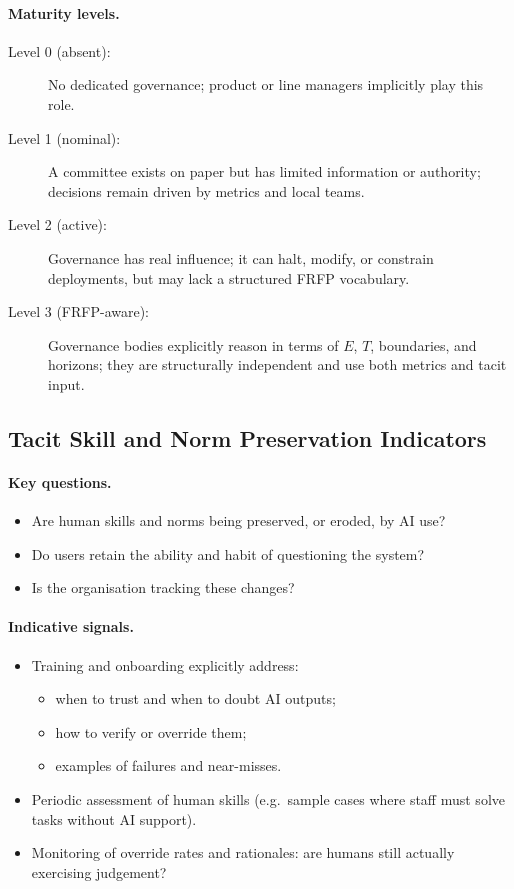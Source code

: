 \paragraph{Maturity levels.}

\begin{description}
  \item[Level 0 (absent):]
    No dedicated governance; product or line managers implicitly play
    this role.
  \item[Level 1 (nominal):]
    A committee exists on paper but has limited information or
    authority; decisions remain driven by metrics and local teams.
  \item[Level 2 (active):]
    Governance has real influence; it can halt, modify, or constrain
    deployments, but may lack a structured FRFP vocabulary.
  \item[Level 3 (FRFP-aware):]
    Governance bodies explicitly reason in terms of \(E\), \(T\),
    boundaries, and horizons; they are structurally independent and
    use both metrics and tacit input.
\end{description}

\subsection{Tacit Skill and Norm Preservation Indicators}

\paragraph{Key questions.}

\begin{itemize}
  \item Are human skills and norms being preserved, or eroded, by AI
        use?
  \item Do users retain the ability and habit of questioning the
        system?
  \item Is the organisation tracking these changes?
\end{itemize}

\paragraph{Indicative signals.}

\begin{itemize}
  \item Training and onboarding explicitly address:
        \begin{itemize}
          \item when to trust and when to doubt AI outputs;
          \item how to verify or override them;
          \item examples of failures and near-misses.
        \end{itemize}
  \item Periodic assessment of human skills (e.g.\ sample cases where
        staff must solve tasks without AI support).
  \item Monitoring of override rates and rationales:
        are humans still actually exercising judgement?
\end{itemize}

